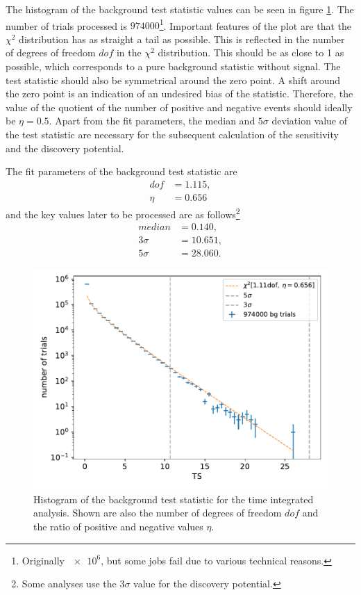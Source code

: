 The histogram of the background test statistic values can be seen in figure \ref{fig:bg_ts_time_int}.
The number of trials processed is $\num{974000}$\footnote{Originally $\num{e6}$, but some jobs fail due to various technical reasons.}.
Important features of the plot are that the $\chi^2$ distribution has as straight a tail as possible.
This is reflected in the number of degrees of freedom $dof$ in the $\chi^2$ distribution.
This should be as close to 1 as possible, which corresponds to a pure background statistic without signal.
The test statistic should also be symmetrical around the zero point.
A shift around the zero point is an indication of an undesired bias of the statistic.
Therefore, the value of the quotient of the number of positive and negative events should ideally be $\eta = \num{0.5}$.
Apart from the fit parameters, the median and $5\sigma$ deviation value of the test statistic are necessary for the subsequent calculation of the sensitivity and the discovery potential.

The fit parameters of the background test statistic are
\begin{align}
  dof &= \num{1.115},\\
  \eta &= \num{0.656}
\end{align}
and the key values later to be processed are as follows\footnote{Some analyses use the $3\sigma$ value for the discovery potential.}
\begin{align}
  median &= \num{0.140},\\
  3\sigma &= \num{10.651},\\
  5\sigma &= \num{28.060}.
\end{align}

\begin{figure}
    \centering
    \includegraphics[width=\linewidth]{Plots/05_csky/9_years_gfu_gold_bg_new.pdf}
    \caption{Histogram of the background test statistic for the time integrated analysis. Shown are also the number of degrees of freedom $dof$ and the ratio of positive and negative values $\eta$.}
    \label{fig:bg_ts_time_int}
\end{figure}

